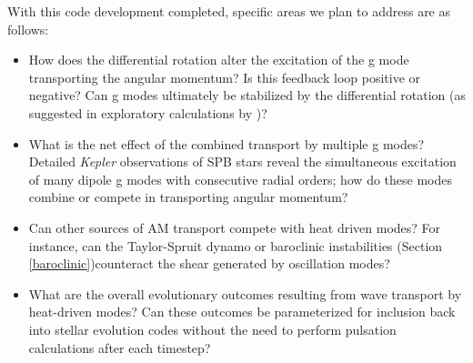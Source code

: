 

With this code development completed, specific areas we plan to address are as follows:
\begin{itemize}
\item How does the differential rotation alter the excitation of the g mode transporting the angular momentum? Is this feedback loop positive or negative? Can g modes ultimately be stabilized by the differential rotation (as suggested in exploratory calculations by \cite{Townsend:2008})?
\item What is the net effect of the combined transport by multiple g modes? Detailed \emph{Kepler} observations of SPB stars \citep[e.g., KIC 10526294][]{Papics:2014} reveal the simultaneous excitation of many dipole g modes with consecutive radial orders; how do these modes combine or compete in transporting angular momentum?
\item Can other sources of AM transport compete with heat driven modes? For instance, can the Taylor-Spruit dynamo or baroclinic instabilities (Section \ref{baroclinic})counteract the shear generated by oscillation modes?
\item What are the overall evolutionary outcomes resulting from wave transport by heat-driven modes? Can these outcomes be parameterized for inclusion back into stellar evolution codes without the need to perform pulsation calculations after each timestep?
\end{itemize}
